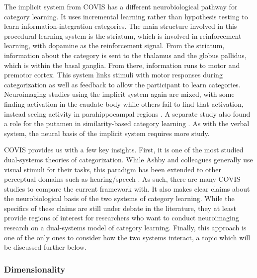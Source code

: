 \documentclass[../dissertation.tex]{subfiles}
\begin{document}
	The implicit system from COVIS has a different neurobiological pathway for category learning. It uses incremental learning rather than hypothesis testing to learn information-integration  categories. The main structure involved in this procedural learning system is the striatum, which is involved in reinforcement learning, with dopamine as the reinforcement signal. From the striatum, information about the category is sent to the thalamus and the globus pallidus, which is within the basal ganglia. From there, information runs to motor and premotor cortex. This system links stimuli with motor responses during categorization as well as feedback to allow the participant to learn categories. Neuroimaging studies using the implicit system again are mixed, with some finding activation in the caudate body while others fail to find that activation, instead seeing activity in parahippocampal regions \citep{Nomura2007,Carpenter2016}. A separate study also found a role for the putamen in similarity-based category learning \citep{Waldschmidt2011}. As with the verbal system, the neural basis of the implicit system requires more study. \par
	COVIS provides us with a few key insights. First, it is one of the most studied dual-systems theories of categorization. While Ashby and colleagues generally use visual stimuli for their tasks, this paradigm has been extended to other perceptual domains such as hearing/speech \citep{Chandrasekaran2014, Chandrasekaran2016}. As such, there are many COVIS studies to compare the current framework with. It also makes clear claims about the neurobiological basis of the two systems of category learning. While the specifics of these claims are still under debate in the literature, they at least provide regions of interest for researchers who want to conduct neuroimaging research on a dual-systems model of category learning. Finally, this approach is one of the only ones to consider how the two systems interact, a topic which will be discussed further below. 
	
\subsubsection{Dimensionality}
\end{document}
